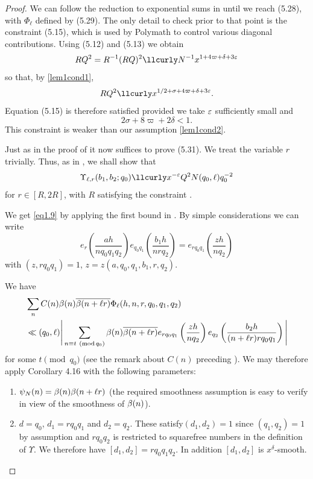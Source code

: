 \documentclass[12pt]{amsart}
\theoremstyle{plain}
\theoremstyle{definition}
\renewcommand{\mod}{\operatorname{mod}}
\numberwithin{equation}{section}
\renewcommand{\lessapprox}{\llcurly}
\begin{document}
 \begin{proof}
We can follow the reduction to exponential sums in \cite[Section 5.3]{polymath8a} until we reach (5.28), with $\Phi_\ell$ defined by (5.29).  The only detail to check prior to that point is the constraint (5.15), which is used by Polymath to control various diagonal contributions.  Using (5.12) and (5.13) we obtain 
$$RQ^2=R^{-1}(RQ)^2 \lessapprox N^{-1}x^{1+4\varpi+\delta+3\e}$$
so that, by \eqref{lem1cond1}, 
$$RQ^2\lessapprox x^{1/2+\sigma+4\varpi+\delta+3\e}.$$
Equation (5.15) is therefore satisfied provided we take $\varepsilon$ sufficiently small and 
$$2\sigma+8\varpi+2\delta<1.$$
This constraint is weaker than our assumption \eqref{lem1cond2}.  

Just as in the proof of  \cite[Theorem 5.8]{polymath8a} it now suffices to prove (5.31). We treat the variable $r$ trivially. Thus, as in \cite[(5.32)]{polymath8a},  we shall show that
 \begin{equation}\label{eq1.9}
\Upsilon_{\ell, r}(b_1, b_2; q_0) \lessapprox x^{-\e} Q^2N (q_0, \ell) q_0^{-2}
 \end{equation}
for $r \in [R, 2R]$, with $R$ satisfying the constraint \cite[(5.12)]{polymath8a}.

We get \eqref{eq1.9} by applying the first bound in \cite[Corollary 4.16]{polymath8a}. By simple considerations we can write
 \[e_r\left(\frac{ah}{nq_0q_1q_2}\right) e_{q_0q_1}
 \left(\frac{b_1h}{nrq_2}\right) = e_{rq_0q_1}
 \left(\frac{zh}{nq_2}\right)\]
with $(z, rq_0q_1) = 1$, $z = z(a, q_0, q_1, b_1, r, q_2)$.

We have 
 \begin{align}
&\sum_n C(n) \b(n) \overline{\b(n + \ell r)} \Phi_\ell (h, n, r, q_0, q_1, q_2)\label{eq1.10}\\
&\ll (q_0, \ell) \Bigg|\sum_{n\equiv t\ (\mod q_0)} \b(n) \overline{\b(n + \ell r)} e_{r q_0q_1} \left(\frac{zh}{nq_2}\right) e_{q_2} \left(\frac{b_2h}{(n+\ell r)r q_0q_1}\right)\Bigg|\notag
 \end{align}
for some $t\pmod {q_0}$ (see the remark about $C(n)$ preceding  \cite[(5.34)]{polymath8a}). We may therefore apply Corollary 4.16 with the following parameters:

\begin{enumerate} 
\item $\psi_N(n) = \beta(n)\beta(n+\ell r)$ (the required smoothness assumption is easy to verify in view of the smoothness of $\beta(n)$). 

\item $d = q_0$, $d_1 = rq_0q_1$ and  $d_2 = q_2$.  These satisfy$(d_1, d_2) = 1$ since $(q_1,q_2)=1$ by assumption and $rq_0q_2$ is restricted to squarefree numbers in the definition of $\Upsilon$.  We therefore have $[d_1, d_2] = rq_0q_1q_2$.  In addition $[d_1,d_2]$ is $x^\delta$-smooth.


\end{enumerate}
\end{proof}
\end{document}
